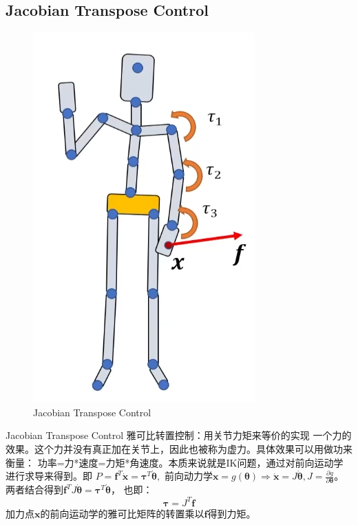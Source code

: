 \documentclass[lang=cn,newtx,10pt,scheme=chinese]{elegantbook}
\begin{document}
\subsection{Jacobian Transpose Control}
\begin{figure}[htbp]
  \centering
  \includegraphics[totalheight=1.8in]{"./image/JacobianTransposeControl.png"}
  \caption{Jacobian Transpose Control} \label{fig:JacobianTransposeControl}
\end{figure}
Jacobian Transpose Control 雅可比转置控制：用关节力矩来等价的实现
一个力的效果。这个力并没有真正加在关节上，因此也被称为虚力。具体效果可以用做功来衡量：
功率=力*速度=力矩*角速度。本质来说就是IK问题，通过对前向运动学进行求导来得到。即
$P=\boldsymbol{f}^{T}\dot{\boldsymbol{x}}=\boldsymbol{\tau}^{T}\dot{\boldsymbol{\theta}},$
前向动力学$\boldsymbol{x}=g(\boldsymbol{\theta})\Rightarrow \dot{\boldsymbol{x}}=J\dot{\boldsymbol{\theta}},
J=\frac{\partial g}{\partial \boldsymbol{\theta}}$。
两者结合得到$\boldsymbol{f}^T J \dot{\boldsymbol{\theta}}=\boldsymbol{\tau}^T \dot{\boldsymbol{\theta}}$，
也即：
\begin{equation}
\boldsymbol{\tau} = J^T \boldsymbol{f}
\end{equation}
加力点$\boldsymbol{x}$的前向运动学的雅可比矩阵的转置乘以$\boldsymbol{f}$得到力矩。
\end{document}
